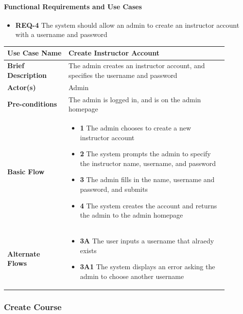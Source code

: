 \documentclass{article}
\begin{document}
\paragraph{Functional Requirements and Use Cases}

\begin{itemize}
  \item \textbf{REQ-4} The system should allow an admin to create an instructor account with a username and password
\end{itemize}

\vspace{0.1in}

\begin{tabular}{| p{0.25\linewidth} | p{0.65\linewidth} |}
  \hline
  \textbf{Use Case Name} & Create Instructor Account \\
  \hline
  \textbf{Brief Description} & The admin creates an instructor account, and specifies the username and password \\
  \hline
  \textbf{Actor(s)} & Admin \\
  \hline
  \textbf{Pre-conditions} & The admin is logged in, and is on the admin homepage\\
  \hline
  \textbf{Basic Flow} & \begin{itemize}
    \item[] \textbf{1} The admin chooses to create a new instructor account
    \item[] \textbf{2} The system prompts the admin to specify the instructor name, username, and password
    \item[] \textbf{3} The admin fills in the name, username and password, and submits
    \item[] \textbf{4} The system creates the account and returns the admin to the admin homepage
  \end{itemize}\\
  \hline
  \textbf{Alternate Flows} & \begin{itemize}
    \item[] \textbf{3A} The user inputs a username that alraedy exists
    \item[] \textbf{3A1} The system displays an error asking the admin to choose another username
  \end{itemize} \\
  \hline
\end{tabular}

\subsubsection{Create Course}
\end{document}
